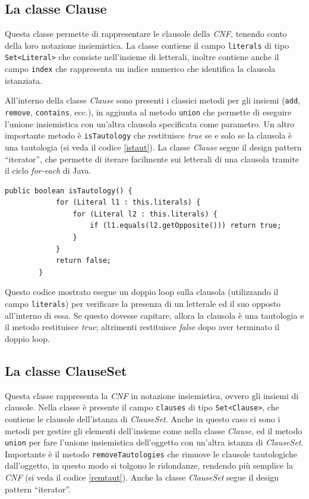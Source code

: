 \documentclass[a4paper,12pt]{report}
\begin{document}
\subsection{La classe Clause}
Questa classe permette di rappresentare le clausole della \emph{CNF}, tenendo conto della loro notazione insiemistica. La classe contiene il campo \texttt{literals} di tipo \texttt{Set<Literal>} che consiste nell'insieme di letterali, inoltre contiene anche il campo \texttt{index} che rappresenta un indice numerico che identifica la clausola istanziata.

All'interno della classe \emph{Clause} sono presenti i classici metodi per gli insiemi (\texttt{add}, \texttt{remove}, \texttt{contains}, ecc.), in aggiunta al metodo \texttt{union} che permette di eseguire l'unione insiemistica con un'altra clausola specificata come parametro. Un altro importante metodo è \texttt{isTautology} che restituisce \emph{true} se e solo se la clausola è una tautologia (si veda il codice \ref{istaut}). La classe \emph{Clause} segue il design pattern ``iterator'', che permette di iterare facilmente sui letterali di una clausola tramite il ciclo \emph{for-each} di Java.

\begin{minipage}{\linewidth}
    \begin{lstlisting}[caption={Metodo isTautology della classe Clause}, label={istaut}]
        public boolean isTautology() {
            for (Literal l1 : this.literals) {
                for (Literal l2 : this.literals) { 
                    if (l1.equals(l2.getOpposite())) return true;
                }
            }
            return false;
        }
    \end{lstlisting}
\end{minipage}
Questo codice mostrato esegue un doppio loop sulla clausola (utilizzando il campo \texttt{literals}) per verificare la presenza di un letterale ed il suo opposto all'interno di essa. Se questo dovesse capitare, allora la clausola è una tautologia e il metodo restituisce \emph{true}; altrimenti restituisce \emph{false} dopo aver terminato il doppio loop.

\subsection{La classe ClauseSet}
Questa classe rappresenta la \emph{CNF} in notazione insiemistica, ovvero gli insiemi di clausole. Nella classe è presente il campo \texttt{clauses} di tipo \texttt{Set<Clause>}, che contiene le clausole dell'istanza di \emph{ClauseSet}. Anche in questo caso ci sono i metodi per gestire gli elementi dell'insieme come nella classe \emph{Clause}, ed il metodo \texttt{union} per fare l'unione insiemistica dell'oggetto con un'altra istanza di \emph{ClauseSet}. Importante è il metodo \texttt{removeTautologies} che rimuove le clausole tautologiche dall'oggetto, in questo modo si tolgono le ridondanze, rendendo più semplice la \emph{CNF} (si veda il codice \ref{remtaut}). Anche la classe \emph{ClauseSet} segue il design pattern ``iterator''.
\end{document}
